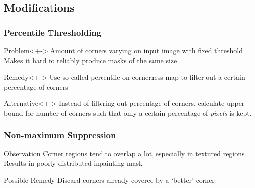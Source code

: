 \documentclass{beamer}
\begin{document}
    \subsection{Modifications}
    \begin{frame}[t]
        \frametitle{Percentile Thresholding}
        \begin{block}{Problem}<+->
            Amount of corners varying on input image with fixed threshold\\
            Makes it hard to reliably produce masks of the same size
        \end{block}
        \begin{block}{Remedy}<+->
            Use so called percentile on cornerness map to filter out a certain percentage of
            corners
        \end{block}
        \begin{block}{Alternative}<+->
            Instead of filtering out percentage of corners, calculate upper bound for number of
            corners such that only a certain percentage of \textit{pixels} is kept.
        \end{block}
    \end{frame}  
     \begin{frame}[t]
        \frametitle{Non-maximum Suppression}
        \begin{block}{Observation}
            Corner regions tend to overlap a lot, especially in textured regions\\
            Results in poorly distributed inpainting mask
        \end{block} 
        \begin{block}{Possible Remedy}
            Discard corners already covered by a `better' corner 
        \end{block}
     \end{frame} 
\end{document}
